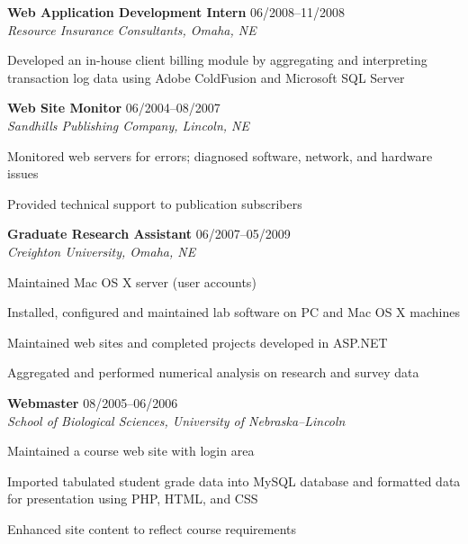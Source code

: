 \begin{itemize1}
	\item \textbf{Web Application Development Intern} \textopenbullet{} 06/2008--11/2008 \\
		\textit{Resource Insurance Consultants, Omaha, NE} \vspace{-1.5mm}
		\begin{itemize1}
			\item Developed an in-house client billing module by aggregating and interpreting transaction log data using Adobe ColdFusion and Microsoft SQL Server			
		\end{itemize1}
	\item \textbf{Web Site Monitor} \textopenbullet{} 06/2004--08/2007 \\
		\textit{Sandhills Publishing Company, Lincoln, NE} \vspace{-1.5mm}
		\begin{itemize1}
			\item Monitored web servers for errors; diagnosed software, network, and hardware issues
			\item Provided technical support to publication subscribers
		\end{itemize1}
	\item \textbf{Graduate Research Assistant} \textopenbullet{} 06/2007--05/2009 \\
		\textit{Creighton University, Omaha, NE} \vspace{-1.5mm}
		\begin{itemize1}
			\item Maintained Mac OS X server (user accounts)
			\item Installed, configured and maintained lab software on PC and Mac OS X machines
			\item Maintained web sites and completed projects developed in ASP.NET
			\item Aggregated and performed numerical analysis on research and survey data
		\end{itemize1}
	\item \textbf{Webmaster} \textopenbullet{} 08/2005--06/2006 \\
		\textit{School of Biological Sciences, University of Nebraska--Lincoln} \vspace{-1.5mm}
		\begin{itemize1}
			\item Maintained a course web site with login area
			\item Imported tabulated student grade data into MySQL database and formatted data for presentation using PHP, HTML, and CSS
			\item Enhanced site content to reflect course requirements 
		\end{itemize1}
\end{itemize1}


